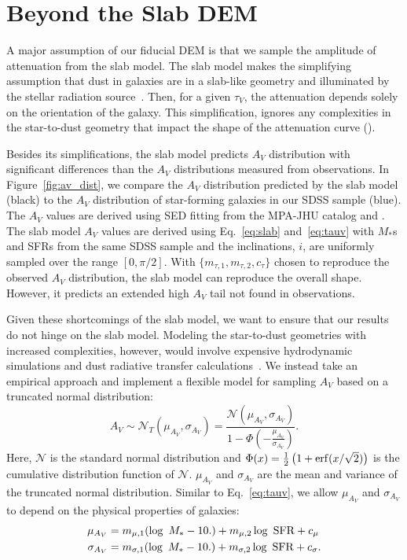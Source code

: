 \section{Beyond the Slab DEM}  \label{sec:nonslab} 
A major assumption of our fiducial DEM is that we sample the amplitude of
attenuation from the slab model. The slab model makes the simplifying assumption 
that dust in galaxies are in a slab-like geometry and illuminated by the
stellar radiation source~\citep{somerville1999}. Then, for a given $\tau_V$,
the attenuation depends solely on the orientation of the galaxy. This
simplification, ignores any complexities in the star-to-dust geometry that
impact the shape of the attenuation curve (). 

Besides its simplifications, the slab model predicts $A_V$ distribution with
significant differences than the $A_V$ distributions measured from
observations. In Figure~\ref{fig:av_dist}, we compare the $A_V$
distribution predicted by the slab model (black) to the $A_V$ 
distribution of star-forming galaxies in our SDSS sample (blue). The $A_V$
values are derived using SED fitting from the \cite{brinchmann2004} MPA-JHU
catalog and . The slab model $A_V$ values are derived using Eq.~\ref{eq:slab}
and~\ref{eq:tauv} with $M_*$s and SFRs from the same SDSS sample and the
inclinations, $i$, are uniformly sampled over the range $[0, \pi/2]$. 
With $\{m_{\tau,1}, m_{\tau,2}, c_\tau\}$ chosen to reproduce the observed
$A_V$ distribution, the slab model can reproduce the overall shape. However, it
predicts an extended high $A_V$ tail not found in observations.

Given these shortcomings of the slab model, we want to ensure that our results
do not hinge on the slab model. Modeling the star-to-dust geometries with
increased complexities, however, would involve expensive hydrodynamic 
simulations and dust radiative transfer
calculations~\citep[\emph{e.g.}][]{narayanan2018}. We instead
take an empirical approach and implement a flexible model for sampling $A_V$
based on a truncated normal distribution: 
\begin{equation} \label{eq:tnorm}
    A_V \sim \mathcal{N}_T(\mu_{A_V}, \sigma_{A_V}) =
    \frac{\mathcal{N}(\mu_{A_V}, \sigma_{A_V})}{1 -
    \Phi\left(-\frac{\mu_{A_V}}{\sigma_{A_V}}\right)}.
\end{equation}
Here, $\mathcal{N}$ is the standard normal distribution and 
$\Phi(x) = \frac{1}{2}\left(1+{\rm erf}(x/\sqrt{2})\right)$ is the cumulative
distribution function of $\mathcal{N}$. $\mu_{A_V}$ and $\sigma_{A_V}$
are the mean and variance of the truncated normal distribution. Similar to
Eq.~\ref{eq:tauv}, we allow $\mu_{A_V}$ and $\sigma_{A_V}$ to depend on the
physical properties of galaxies: 
\begin{align}\label{eq:tnorm_param} 
    \mu_{A_V}       &= m_{\mu,1} (\log~M_* - 10.) + m_{\mu,2} \log~{\rm SFR} + c_\mu \\
    \sigma_{A_V}    &= m_{\sigma,1} (\log~M_* - 10.) + m_{\sigma,2} \log~{\rm SFR} + c_\sigma. 
\end{align}

